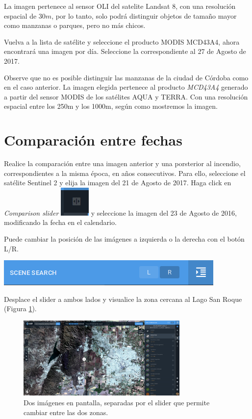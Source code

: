 \documentclass[a4paper,12pt]{book}
\begin{document}
La imagen pertenece al sensor OLI del satelite Landsat 8, con una resolución espacial de $30m$, por lo tanto, solo podrá distinguir objetos de tamaño mayor como manzanas o parques, pero no más chicos.

Vuelva a la lista de satélite y seleccione el producto MODIS MCD43A4, ahora encontrará una imagen por día. Seleccione la correspondiente al 27 de Agosto de 2017.

Observe que no es posible distinguir las manzanas de la ciudad de Córdoba como en el caso anterior. La imagen elegida pertenece al producto \emph{MCD43A4} generado a partir del sensor MODIS de los satélites AQUA y TERRA. Con una resolución espacial entre los 250m y los 1000m, según como mostremos la imagen.

\section{Comparación entre fechas}
Realice la comparación entre una imagen anterior y una porsterior al incendio, correspondientes a la misma época, en años consecutivos. Para ello, seleccione el satélite Sentinel 2 y elija la imagen del 21 de Agosto de 2017. Haga click en \emph{Comparison slider} \includegraphics[scale=0.2]{in:LR.png} y seleccione la imagen del 23 de Agosto de 2016, modificando la fecha en el calendario.

Puede cambiar la posición de las imágenes a izquierda o la derecha con el botón L/R.

\begin{center}\includegraphics[scale=0.4]{in:LorR.png}\end{center}

Desplace el slider a ambos lados y visualice la zona cercana al Lago San Roque (Figura \ref{fig:slider}).

\begin{figure}[h!]
    \centering
    \includegraphics[width=0.75\textwidth]{fig:slider.png}
    \caption{Dos imágenes en pantalla, separadas por el slider que permite cambiar entre las dos zonas.}
    \label{fig:slider}
\end{figure}
\end{document}
